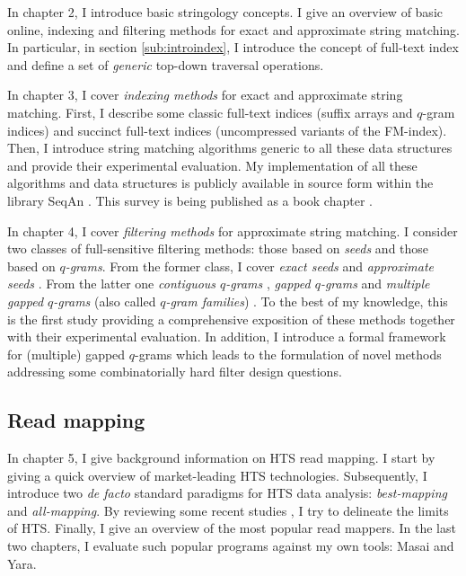 In chapter 2, I introduce basic stringology concepts.
I give an overview of basic online, indexing and filtering methods for exact and approximate string matching.
In particular, in section \ref{sub:introindex}, I introduce the concept of full-text index and define a set of \emph{generic} top-down traversal operations.

In chapter 3, I cover \emph{indexing methods} for exact and approximate string matching.
First, I describe some classic full-text indices (suffix arrays and $q$-gram indices) and succinct full-text indices (uncompressed variants of the FM-index).
Then, I introduce string matching algorithms generic to all these data structures and provide their experimental evaluation.
My implementation of all these algorithms and data structures is publicly available in source form within the \CC library SeqAn \citep{Doering2008}.
This survey is being published as a book chapter \citep{Weese2015}.

In chapter 4, I cover \emph{filtering methods} for approximate string matching.
I consider two classes of full-sensitive filtering methods: those based on \emph{seeds} and those based on \emph{$q$-grams}.
From the former class, I cover
\emph{exact seeds} \citep{Baeza1992} and
\emph{approximate seeds} \citep{Myers1994,Navarro2000}.
From the latter one
\emph{contiguous $q$-grams} \citep{Jokinen1991},
\emph{gapped $q$-grams} \citep{Burkhardt2001} and
\emph{multiple gapped $q$-grams} (also called \emph{$q$-gram families}) \citep{Kucherov2005}.
To the best of my knowledge, this is the first study providing a comprehensive exposition of these methods together with their experimental evaluation.
In addition, I introduce a formal framework for (multiple) gapped $q$-grams which leads to the formulation of novel methods addressing some combinatorially hard filter design questions.

\subsection{Read mapping}

In chapter 5, I give background information on HTS read mapping.
I start by giving a quick overview of market-leading HTS technologies.
Subsequently, I introduce two \emph{de facto} standard paradigms for HTS data analysis: \emph{best-mapping} and \emph{all-mapping}.
By reviewing some recent studies \citep{Derrien2012,Lee2012}, I try to delineate the limits of HTS.
Finally, I give an overview of the most popular read mappers.
In the last two chapters, I evaluate such popular programs against my own tools: Masai \citep{Siragusa2013} and Yara.

